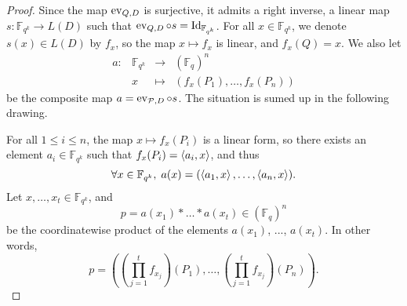 \documentclass[11pt]{article}
\begin{document}
\begin{proof}
  Since the map $\operatorname{ev}_{Q, D}$ is surjective, it admits a right inverse, \ie a linear
  map $s: \mathbb{F}_{q^k} \to L(D)$
  such that
  $\operatorname{ev}_{Q, D}\circ s = \operatorname{Id}_{\mathbb{F}_{q^k}}$.
For all $x\in\mathbb{F}_{q^k}$, we denote $s(x)\in L(D)$ by $f_x$,
so the map $x\mapsto f_x$ is linear, and $f_x(Q)=x$. We
  also let
  \[
        \begin{array}{cccc}
          a: & \mathbb{F}_{q^k} & \to & (\mathbb{F}_{q})^n \\
          & x & \mapsto & (f_x(P_1), \dots, f_x(P_n))
\end{array}
  \]
  be the composite map $a = \operatorname{ev}_{\mathcal{P}, D}\circ s$. The situation is sumed up in the
  following drawing.
   \begin{center}
  \end{center}
  For all $1\leq i\leq n$, the map
  $x\mapsto f_x(P_i)$ is a linear form, so there exists an element
  $a_i\in\mathbb{F}_{q^k}$ such that $f_x(P_i) = \left\langle a_i,x\right\rangle$,
and thus
  \[
    \forall x\in\mathbb{F}_{q^k},\; a(x) = (\left\langle a_1,x\right\rangle, \dots, \left\langle a_n,x\right\rangle).
  \]
  Let $x,\dots,x_t\in\mathbb{F}_{q^k}$, and
  \[
    p = a(x_1)*\dots*a(x_t)\in(\mathbb{F}_{q})^n
  \]
  be the coordinatewise product of the elements $a(x_1)$, ..., $a(x_t)$. In
  other words,
  \[
    p = ((\prod_{j=1}^tf_{x_j})(P_1), \dots, (\prod_{j=1}^tf_{x_j})(P_n)).
  \]


\end{proof}
\end{document}
